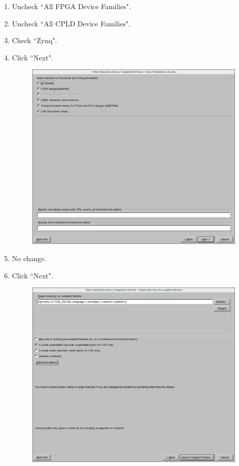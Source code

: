 \begin{flushleft}
\begin{enumerate}
		\item Uncheck ``All FPGA Device Families".
		\item Uncheck ``All CPLD Device Families".
		\item Check ``Zynq".
		\item Click ``Next".

	\begin{figure}[H]
	\centering\captionsetup{type=figure}\includegraphics[scale=0.5]{Xilinx_CompXLib_4_BuildAll}
		\label{fig:wizard_page_4}
	\end{figure}

		\item No change.
		\item Click ``Next".

	\begin{figure}[H]
	\centering\captionsetup{type=figure}\includegraphics[scale=0.5]{Xilinx_CompXLib_5_SelectDefaults}
		\label{fig:wizard_page_5}
	\end{figure}


\end{enumerate}
\end{flushleft}
